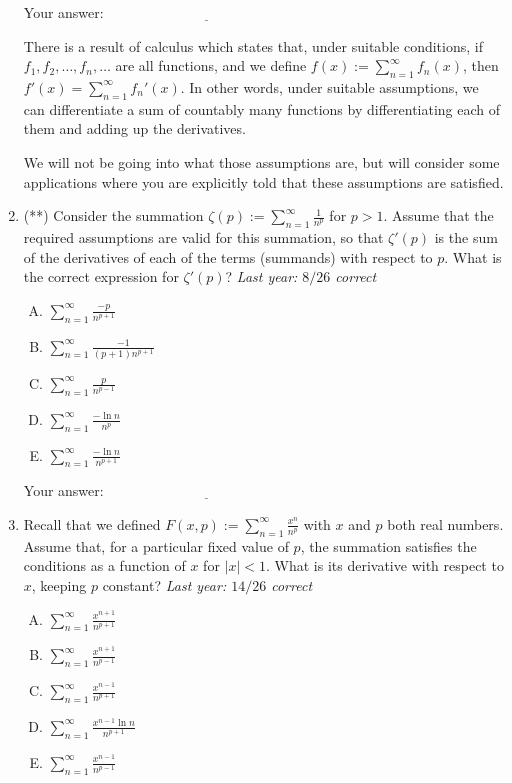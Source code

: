 \documentclass[10pt]{amsart}
\begin{document}
\begin{enumerate}
  \vspace{0.1in}
  Your answer: $\underline{\qquad\qquad\qquad\qquad\qquad\qquad\qquad}$
  \vspace{0.15in}

  There is a result of calculus which states that, under suitable
  conditions, if $f_1, f_2, \dots, f_n, \dots$ are all functions, and
  we define $f(x) := \sum_{n=1}^\infty f_n(x)$, then $f'(x) =
  \sum_{n=1}^\infty f_n'(x)$. In other words, under suitable
  assumptions, we can differentiate a sum of countably many functions
  by differentiating each of them and adding up the derivatives.

  We will not be going into what those assumptions are, but will
  consider some applications where you are explicitly told that these
  assumptions are satisfied.

\item (**) Consider the summation $\zeta(p) := \sum_{n=1}^\infty
  \frac{1}{n^p}$ for $p > 1$. Assume that the required assumptions are
  valid for this summation, so that $\zeta'(p)$ is the sum of the
  derivatives of each of the terms (summands) with respect to
  $p$. What is the correct expression for $\zeta'(p)$? {\em Last year:
  $8/26$ correct}
  
  \begin{enumerate}[(A)]
  \item $\sum_{n=1}^\infty \frac{-p}{n^{p+1}}$
  \item $\sum_{n=1}^\infty \frac{-1}{(p+1)n^{p+1}}$
  \item $\sum_{n=1}^\infty \frac{p}{n^{p-1}}$
  \item $\sum_{n=1}^\infty \frac{-\ln n}{n^p}$
  \item $\sum_{n=1}^\infty \frac{-\ln n}{n^{p+1}}$
  \end{enumerate}

  \vspace{0.1in}
  Your answer: $\underline{\qquad\qquad\qquad\qquad\qquad\qquad\qquad}$
  \vspace{0.15in}

\item Recall that we defined $F(x,p) := \sum_{n=1}^\infty
  \frac{x^n}{n^p}$ with $x$ and $p$ both real numbers. Assume that,
  for a particular fixed value of $p$, the summation satisfies the
  conditions as a function of $x$ for $|x| < 1$. What is its
  derivative with respect to $x$, keeping $p$ constant? {\em Last
  year: $14/26$ correct}

  \begin{enumerate}[(A)]
  \item $\sum_{n=1}^\infty \frac{x^{n+1}}{n^{p+1}}$
  \item $\sum_{n=1}^\infty \frac{x^{n+1}}{n^{p-1}}$
  \item $\sum_{n=1}^\infty \frac{x^{n-1}}{n^{p+1}}$
  \item $\sum_{n=1}^\infty \frac{x^{n-1}\ln n}{n^{p+1}}$
  \item $\sum_{n=1}^\infty \frac{x^{n-1}}{n^{p-1}}$
  \end{enumerate}


\end{enumerate}
\end{document}

